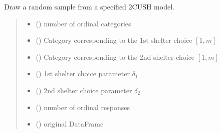 \documentclass[letterpaper,10pt,english]{sphinxmanual}
\begin{document}
\begin{fulllineitems}
\label{\detokenize{cubmods:cubmods.cush2.draw}}
\pysigstartsignatures
{}
\pysigstopsignatures
\sphinxAtStartPar
Draw a random sample from a specified 2\sphinxhyphen{}CUSH model.
\begin{quote}\begin{description}
\begin{itemize}
\item {} 
\sphinxAtStartPar
{} () \textendash{} number of ordinal categories

\item {} 
\sphinxAtStartPar
{} () \textendash{} Category corresponding to the 1st shelter choice \([1,m]\)

\item {} 
\sphinxAtStartPar
{} () \textendash{} Category corresponding to the 2nd shelter choice \([1,m]\)

\item {} 
\sphinxAtStartPar
{} () \textendash{} 1st shelter choice parameter \(\delta_1\)

\item {} 
\sphinxAtStartPar
{} () \textendash{} 2nd shelter choice parameter \(\delta_2\)

\item {} 
\sphinxAtStartPar
{} () \textendash{} number of ordinal responses

\item {} 
\sphinxAtStartPar
{} () \textendash{} original DataFrame


\end{itemize}
\end{description}
\end{quote}
\end{fulllineitems}
\end{document}
